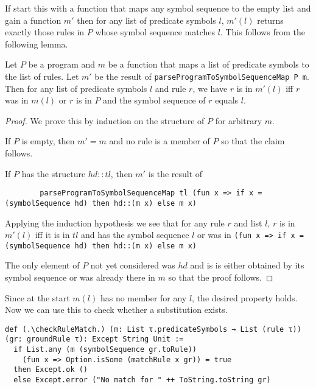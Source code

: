 If start this with a function that maps any symbol sequence to the empty list and gain a function $m'$ then for any list of predicate symbols $l$, $m'(l)$ returns exactly those rules in $P$ whose symbol sequence matches $l$. This follows from the following lemma.

\begin{lemma}[\parseProgramToSymbolSequenceMapmem]\label{lem:parseProgramToSymbolSequenceMap}
    Let $P$ be a program and $m$ be a function that maps a list of predicate symbols to the list of rules. Let $m'$ be the result of \lstinline|parseProgramToSymbolSequenceMap P m|. Then for any list of predicate symbols $l$ and rule $r$, we have $r$ is in $m'(l)$ iff $r$ was in $m(l)$ or $r$ is in $P$ and the symbol sequence of $r$ equals $l$.
\end{lemma}
\begin{proof}
    We prove this by induction on the structure of $P$ for arbitrary $m$.

    If $P$ is empty, then $m' = m$ and no rule is a member of $P$ so that the claim follows.

    If $P$ has the structure $hd::tl$, then $m'$ is the result of 

    \begin{lstlisting}
        parseProgramToSymbolSequenceMap tl (fun x => if x = (symbolSequence hd) then hd::(m x) else m x)
    \end{lstlisting}

    Applying the induction hypothesis we see that for any rule $r$ and list $l$, $r$ is in $m'(l)$ iff it is in $tl$ and has the symbol sequence $l$ or was in \lstinline|(fun x => if x = (symbolSequence hd) then hd::(m x) else m x)|

    The only element of $P$ not yet considered was $hd$ and is is either obtained by its symbol sequence or was already there in $m$ so that the proof follows.
\end{proof}

Since at the start $m(l)$ has no member for any $l$, the desired property holds. Now we can use this to check whether a substitution exists.

\begin{lstlisting}
def (.\checkRuleMatch.) (m: List τ.predicateSymbols → List (rule τ)) (gr: groundRule τ): Except String Unit :=
  if List.any (m (symbolSequence gr.toRule)) 
    (fun x => Option.isSome (matchRule x gr)) = true
  then Except.ok ()
  else Except.error ("No match for " ++ ToString.toString gr)
\end{lstlisting}


